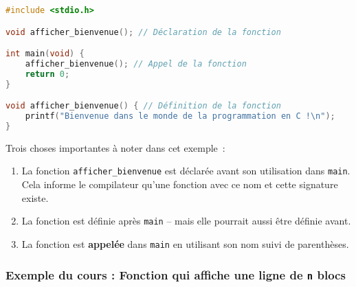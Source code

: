 \begin{lstlisting}[language=c]
#include <stdio.h>

void afficher_bienvenue(); // Déclaration de la fonction

int main(void) {
    afficher_bienvenue(); // Appel de la fonction
    return 0;
}

void afficher_bienvenue() { // Définition de la fonction
    printf("Bienvenue dans le monde de la programmation en C !\n");
}
\end{lstlisting}

Trois choses importantes à noter dans cet exemple :
\begin{enumerate}
	\item La fonction \texttt{afficher\_bienvenue} est déclarée avant son utilisation dans \texttt{main}. Cela informe le compilateur qu'une fonction avec ce nom et cette signature existe.
	\item La fonction est définie après \texttt{main} -- mais elle pourrait aussi être définie avant.
	\item La fonction est \textbf{appelée} dans \texttt{main} en utilisant son nom suivi de parenthèses.
\end{enumerate}

\subsubsection{Exemple du cours : Fonction qui affiche une ligne de \texttt{n} blocs}
